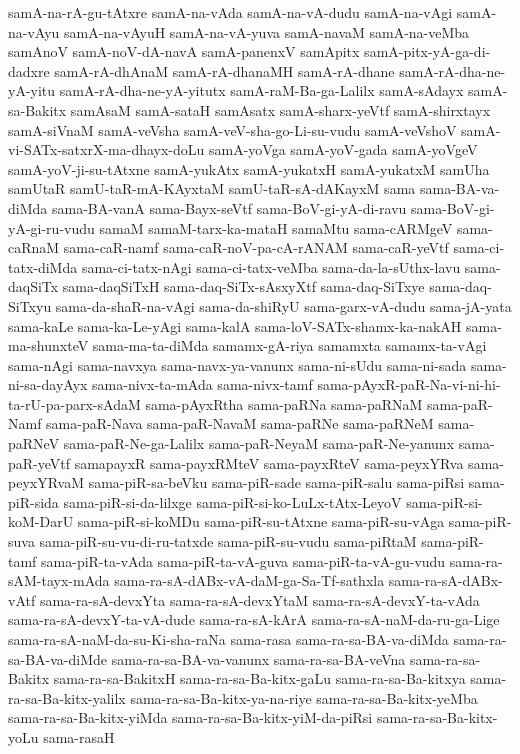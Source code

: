 {samA-na-rA-gu-tAtxre
samA-na-vAda
samA-na-vA-dudu
samA-na-vAgi
samA-na-vAyu
samA-na-vAyuH
samA-na-vA-yuva
samA-navaM
samA-na-veMba
samAnoV
samA-noV-dA-navA
samA-panenxV
samApitx
samA-pitx-yA-ga-di-dadxre
samA-rA-dhAnaM
samA-rA-dhanaMH
samA-rA-dhane
samA-rA-dha-ne-yA-yitu
samA-rA-dha-ne-yA-yitutx
samA-raM-Ba-ga-Lalilx
samA-sAdayx
samA-sa-Bakitx
samAsaM
samA-sataH
samAsatx
samA-sharx-yeVtf
samA-shirxtayx
samA-siVnaM
samA-veVsha
samA-veV-sha-go-Li-su-vudu
samA-veVshoV
samA-vi-SATx-satxrX-ma-dhayx-doLu
samA-yoVga
samA-yoV-gada
samA-yoVgeV
samA-yoV-ji-su-tAtxne
samA-yukAtx
samA-yukatxH
samA-yukatxM
samUha
samUtaR
samU-taR-mA-KAyxtaM
samU-taR-sA-dAKayxM
sama
sama-BA-va-diMda
sama-BA-vanA
sama-Bayx-seVtf
sama-BoV-gi-yA-di-ravu
sama-BoV-gi-yA-gi-ru-vudu
samaM
samaM-tarx-ka-mataH
samaMtu
sama-cARMgeV
sama-caRnaM
sama-caR-namf
sama-caR-noV-pa-cA-rANAM
sama-caR-yeVtf
sama-ci-tatx-diMda
sama-ci-tatx-nAgi
sama-ci-tatx-veMba
sama-da-la-sUthx-lavu
sama-daqSiTx
sama-daqSiTxH
sama-daq-SiTx-sAsxyXtf
sama-daq-SiTxye
sama-daq-SiTxyu
sama-da-shaR-na-vAgi
sama-da-shiRyU
sama-garx-vA-dudu
sama-jA-yata
sama-kaLe
sama-ka-Le-yAgi
sama-kalA
sama-loV-SATx-shamx-ka-nakAH
sama-ma-shunxteV
sama-ma-ta-diMda
samamx-gA-riya
samamxta
samamx-ta-vAgi
sama-nAgi
sama-navxya
sama-navx-ya-vanunx
sama-ni-sUdu
sama-ni-sada
sama-ni-sa-dayAyx
sama-nivx-ta-mAda
sama-nivx-tamf
sama-pAyxR-paR-Na-vi-ni-hi-ta-rU-pa-parx-sAdaM
sama-pAyxRtha
sama-paRNa
sama-paRNaM
sama-paR-Namf
sama-paR-Nava
sama-paR-NavaM
sama-paRNe
sama-paRNeM
sama-paRNeV
sama-paR-Ne-ga-Lalilx
sama-paR-NeyaM
sama-paR-Ne-yanunx
sama-paR-yeVtf
samapayxR
sama-payxRMteV
sama-payxRteV
sama-peyxYRva
sama-peyxYRvaM
sama-piR-sa-beVku
sama-piR-sade
sama-piR-salu
sama-piRsi
sama-piR-sida
sama-piR-si-da-lilxge
sama-piR-si-ko-LuLx-tAtx-LeyoV
sama-piR-si-koM-DarU
sama-piR-si-koMDu
sama-piR-su-tAtxne
sama-piR-su-vAga
sama-piR-suva
sama-piR-su-vu-di-ru-tatxde
sama-piR-su-vudu
sama-piRtaM
sama-piR-tamf
sama-piR-ta-vAda
sama-piR-ta-vA-guva
sama-piR-ta-vA-gu-vudu
sama-ra-sAM-tayx-mAda
sama-ra-sA-dABx-vA-daM-ga-Sa-Tf-sathxla
sama-ra-sA-dABx-vAtf
sama-ra-sA-devxYta
sama-ra-sA-devxYtaM
sama-ra-sA-devxY-ta-vAda
sama-ra-sA-devxY-ta-vA-dude
sama-ra-sA-kArA
sama-ra-sA-naM-da-ru-ga-Lige
sama-ra-sA-naM-da-su-Ki-sha-raNa
sama-rasa
sama-ra-sa-BA-va-diMda
sama-ra-sa-BA-va-diMde
sama-ra-sa-BA-va-vanunx
sama-ra-sa-BA-veVna
sama-ra-sa-Bakitx
sama-ra-sa-BakitxH
sama-ra-sa-Ba-kitx-gaLu
sama-ra-sa-Ba-kitxya
sama-ra-sa-Ba-kitx-yalilx
sama-ra-sa-Ba-kitx-ya-na-riye
sama-ra-sa-Ba-kitx-yeMba
sama-ra-sa-Ba-kitx-yiMda
sama-ra-sa-Ba-kitx-yiM-da-piRsi
sama-ra-sa-Ba-kitx-yoLu
sama-rasaH
}
